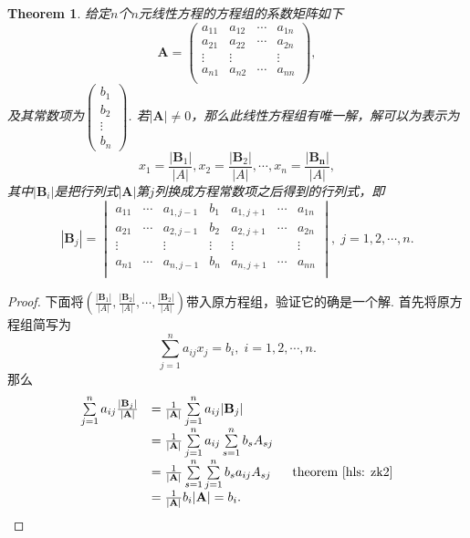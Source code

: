 \documentclass{article}
\newtheorem{theorem}{Theorem}[section]
\newcommand{\mbf}[1]{\mathbf{#1}}
\begin{document}
\begin{theorem}
\rm 给定$n$个$n$元线性方程的方程组的系数矩阵如下
$$
\mbf{A}=
\begin{pmatrix}
a_{11} & a_{12} & \cdots & a_{1n} \\
a_{21} & a_{22} & \cdots & a_{2n} \\
\vdots & \vdots & 		 & \vdots \\
a_{n1} & a_{n2} & \cdots & a_{nn} \\
\end{pmatrix},
$$
及其常数项为$\begin{pmatrix}b_1 \\ b_2 \\ \vdots \\b_n \end{pmatrix}$. 若$|\mbf{A}| \neq 0$，那么此线性方程组有唯一解，解可以为表示为
$$
x_1 = \frac{|\mbf{B}_1|}{|A|},x_2 = \frac{|\mbf{B}_2|}{|A|},\cdots, x_n = \frac{|\mbf{B_n}|}{|A|},
$$
其中$|\mbf{B}_i|$是把行列式$|\mbf{A}|$第$j$列换成方程常数项之后得到的行列式，即
$$
|\mbf{B}_j| = 
\begin{vmatrix}
a_{11} & \cdots & a_{1,j-1}  & b_1 & a_{1,j+1} & \cdots & a_{1n} \\
a_{21} & \cdots & a_{2,j-1}  & b_2 & a_{2,j+1} & \cdots & a_{2n} \\
\vdots &  & \vdots & \vdots &  \vdots & & \vdots \\
a_{n1} & \cdots & a_{n,j-1}  & b_n & a_{n,j+1} & \cdots & a_{nn} \\
\end{vmatrix},\; j=1,2,\cdots,n.
$$

\end{theorem}


\begin{proof}
下面将$(\frac{|\mbf{B}_1|}{|A|},\frac{|\mbf{B}_2|}{|A|},\cdots,\frac{|\mbf{B}_2|}{|A|})$带入原方程组，验证它的确是一个解. 首先将原方程组简写为
$$
\sum\limits_{j=1}^n a_{ij}x_j = b_i , \; i = 1,2,\cdots,n.
$$
那么
$$
\begin{array}{ll}
\sum\limits_{j=1}^n a_{ij}\frac{|\mbf{B}_j|}{|\mbf{A}|} &= \frac{1}{|\mbf{A}|}\sum\limits_{j=1}^n a_{ij}|\mbf{B}_j| \\
&= \frac{1}{|\mbf{A}|}\sum\limits_{j=1}^n a_{ij}\sum\limits_{s=1}^n b_sA_{sj} \\
&= \frac{1}{|\mbf{A}|}\sum\limits_{s=1}^n\sum\limits_{j=1}^n b_sa_{ij}A_{sj} ~  ~ ~ ~ ~\text{theorem \ref{hls: zk2}}\\ 
&= \frac{1}{|\mbf{A}|} b_i |\mbf{A}| = b_i.
\end{array}
$$
\end{proof}
\end{document}
